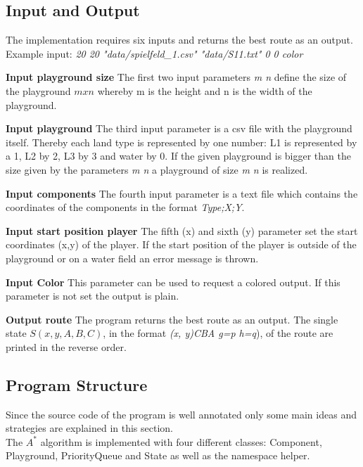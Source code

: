 \documentclass{article}
\begin{document}
\subsection{Input and Output}
The implementation requires six inputs and returns the best route as an output.\\
Example input: \textit{20 20 "data/spielfeld\_1.csv" "data/S11.txt" 0 0 color}\\
\begin{description}
    \item{\textbf{Input playground size}} The first two input parameters \textit{m n} define the size of the playground $m x n$ whereby m is the height and n is the width of the playground. %
    \item{\textbf{Input playground}} The third input parameter is a csv file with the playground itself. Thereby each land type is represented by one number: L1 is represented by a 1, L2 by 2, L3 by 3 and water by 0. If the given playground is bigger than the size given by the parameters \textit{m n} a playground of size \textit{m n} is realized.
    \item{\textbf{Input components}} The fourth input parameter is a text file which contains the coordinates of the components in the format \textit{Type;X;Y}.
    \item{\textbf{Input start position player}} The fifth (x) and sixth (y) parameter set the start coordinates (x,y) of the player.  If the start position of the player is outside of the playground or on a water field an error message is thrown.
    \item{\textbf{Input Color}} This parameter can be used to request a colored output. If this parameter is not set the output is plain.
    \item{\textbf{Output route}} The program returns the best route as an output. The single state $S(x,y,A,B,C)$, in the format \textit{(x, y)CBA g=p h=q}), of the route are printed in the reverse order.
\end{description}

\subsection{Program Structure}
Since the source code of the program is well annotated only some main ideas and strategies are explained in this section.\\
The $A^*$ algorithm is implemented with four different classes: Component, Playground, PriorityQueue and State as well as the namespace helper. 
\end{document}
